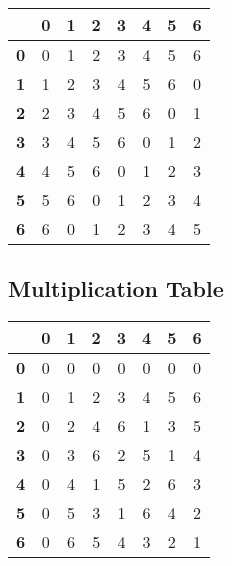 \documentclass{article}
\begin{document}
\begin{tabular}{ | c | c | c | c | c | c | c | c | }
	           & \textbf{0} & \textbf{1} & \textbf{2} & \textbf{3} & \textbf{4} & \textbf{5} & \textbf{6} \\
	\hline
	\textbf{0} & 0          & 1          & 2          & 3          & 4          & 5          & 6          \\
	\textbf{1} & 1          & 2          & 3          & 4          & 5          & 6          & 0          \\
	\textbf{2} & 2          & 3          & 4          & 5          & 6          & 0          & 1          \\
	\textbf{3} & 3          & 4          & 5          & 6          & 0          & 1          & 2          \\
	\textbf{4} & 4          & 5          & 6          & 0          & 1          & 2          & 3          \\
	\textbf{5} & 5          & 6          & 0          & 1          & 2          & 3          & 4          \\
	\textbf{6} & 6          & 0          & 1          & 2          & 3          & 4          & 5          \\
\end{tabular}

\subsection{Multiplication Table}

\begin{tabular}{ | c | c | c | c | c | c | c | c | }
	           & \textbf{0} & \textbf{1} & \textbf{2} & \textbf{3} & \textbf{4} & \textbf{5} & \textbf{6} \\
	\hline
	\textbf{0} & 0          & 0          & 0          & 0          & 0          & 0          & 0          \\
	\textbf{1} & 0          & 1          & 2          & 3          & 4          & 5          & 6          \\
	\textbf{2} & 0          & 2          & 4          & 6          & 1          & 3          & 5          \\
	\textbf{3} & 0          & 3          & 6          & 2          & 5          & 1          & 4          \\
	\textbf{4} & 0          & 4          & 1          & 5          & 2          & 6          & 3          \\
	\textbf{5} & 0          & 5          & 3          & 1          & 6          & 4          & 2          \\
	\textbf{6} & 0          & 6          & 5          & 4          & 3          & 2          & 1          \\
\end{tabular}
\end{document}
